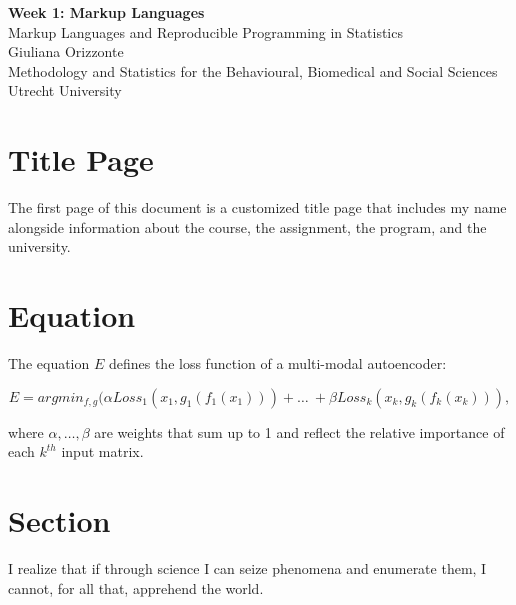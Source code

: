 \documentclass[12pt]{article}
\begin{document}
 

 

\begin{titlepage}
    \centering
    \Large\textbf{Week 1: Markup Languages}\\
    \vspace{1.5cm}
    Markup Languages and Reproducible Programming in Statistics\\
    \vspace{1cm}
    \large{Giuliana Orizzonte}\\
    \vspace{8cm}
    Methodology and Statistics for the Behavioural, Biomedical and Social Sciences\\
    \vspace{0.5cm}
    Utrecht University\\
\end{titlepage}


\section{Title Page}
The first page of this document is a customized title page that includes my name alongside information about the course, the assignment, the program, and the university.

\section{Equation}
The equation $E$ defines the loss function of a multi-modal autoencoder:

\begin{equation}
E = argmin_{f,g} (\alpha Loss_1 (x_1, g_1(f_1(x_1))) + \ldots \ + \beta Loss_k (x_k, g_k(f_k(x_k))),\label{AE} 
\end{equation}

where $\alpha ,\ldots, \beta$ are weights that sum up to 1 and reflect the relative importance of each $k^{th}$ input matrix.

\section{Section}
I realize that if through science I can seize phenomena and enumerate them, I cannot, for all that, apprehend the world.
\end{document}
